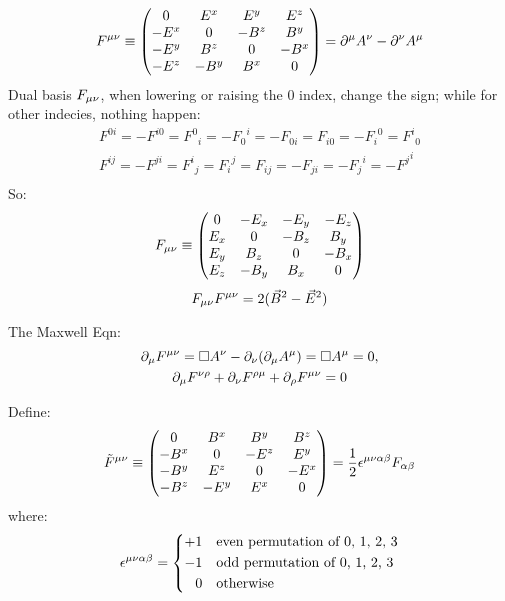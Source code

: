 \begin{equation}
    F^{\mu\nu} \equiv 
	\begin{pmatrix}
	    0	& E^x	& E^y	& E^z	\\
	    -E^x    & 0	& -B^z	& B^y	\\
	    -E^y    & B^z   & 0	& -B^x	\\
	    -E^z    & -B^y  & B^x   & 0	\\
	\end{pmatrix}
	= \partial^\mu A^\nu - \partial^\nu A^\mu
\end{equation}
Dual basis $F_{\mu\nu}$, when lowering or raising the 0 index, change the sign; while
for other indecies, nothing happen:
\[
    \begin{aligned}
    F^{0i} = -F^{i0} = {F^0}_i = -{F_0}^i = -F_{0i} =  F_{i0} = -{F_i}^0 = {F^i}_0   \\
    F^{ij} = -F^{ji} = {F^i}_j =  {F_i}^j =  F_{ij} = -F_{ji} = -{F_j}^i = -{F^j}^i \\
    \end{aligned}
\]
So:
\begin{equation}
    F_{\mu\nu} \equiv 
	\begin{pmatrix}
	    0	& -E_x	& -E_y	& -E_z	\\
	    E_x    & 0	& -B_z	& B_y	\\
	    E_y    & B_z   & 0	& -B_x	\\
	    E_z    & -B_y  & B_x   & 0	\\
	\end{pmatrix}
\end{equation}
\[
    F_{\mu\nu}F^{\mu\nu} = 2(\vec{B}^2 - \vec{E}^2)
\]

The Maxwell Eqn:
\begin{equation}
    \begin{gathered}
	\partial_\mu F^{\mu\nu} = \Box A^\nu - \partial_\nu(\partial_\mu A^\mu) = \Box A^\mu = 0, \notag\\
	\partial_\mu F^{\nu\rho} + \partial_\nu F^{\rho\mu} + \partial_\rho F^{\mu\nu} = 0
    \end{gathered}
\end{equation}

Define:
\begin{equation}
    \tilde{F}^{\mu\nu} \equiv 
	\begin{pmatrix}
	    0	& B^x	& B^y	& B^z	\\
	    -B^x    & 0	& -E^z	& E^y	\\
	    -B^y    & E^z   & 0	& -E^x	\\
	    -B^z    & -E^y  & E^x   & 0	\\
	\end{pmatrix} 
	= \frac{1}{2}\epsilon^{\mu\nu\alpha\beta}F_{\alpha\beta}
\end{equation}
where:
\[
    \epsilon^{\mu\nu\alpha\beta} = 
    \left\{ 
	\begin{aligned}
	    +1	&\quad	\text{even permutation of 0, 1, 2, 3}	\\
	    -1	&\quad	\text{odd permutation of 0, 1, 2, 3}	\\
	    0	&\quad	\text{otherwise}
	\end{aligned}
	\right.
\]

